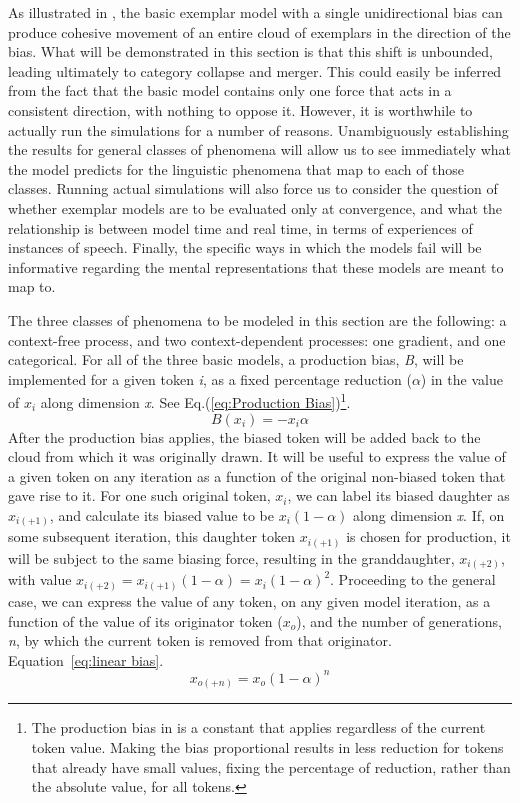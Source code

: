 As illustrated in , the basic
exemplar model with a single unidirectional bias can produce cohesive
movement of an entire cloud of exemplars in the direction of the bias.
What will be demonstrated in this section is that this shift is unbounded,
leading ultimately to category collapse and merger. This could easily
be inferred from the fact that the basic model contains only one force
that acts in a consistent direction, with nothing to oppose it. However,
it is worthwhile to actually run the simulations for a number of reasons.
Unambiguously establishing the results for general classes of phenomena
will allow us to see immediately what the model predicts for the linguistic
phenomena that map to each of those classes. Running actual simulations
will also force us to consider the question of whether exemplar models
are to be evaluated only at convergence, and what the relationship
is between model time and real time, in terms of experiences of instances
of speech. Finally, the specific ways in which the models fail will
be informative regarding the mental representations that these models
are meant to map to. 

The three classes of phenomena to be modeled in this section are the
following: a context-free process, and two context-dependent processes:
one gradient, and one categorical. For all of the three basic models,
a production bias, \emph{B}, will be implemented for a given token
\emph{i}, as a fixed percentage reduction ($\alpha$) in the value
of \emph{$x_{i}$} along dimension \emph{x}. See Eq.(\ref{eq:Production Bias})\footnote{The production bias in \citet{Pierrehumbert2000} is a constant that
applies regardless of the current token value. Making the bias proportional
results in less reduction for tokens that already have small values,
fixing the percentage of reduction, rather than the absolute value,
for all tokens.}. 
\begin{equation}
B(x_{i})=-x_{i}\alpha\label{eq:Production Bias}
\end{equation}
After the production bias applies, the biased token will be added
back to the cloud from which it was originally drawn. It will be useful
to express the value of a given token on any iteration as a function
of the original non-biased token that gave rise to it. For one such
original token, $x_{i}$, we can label its biased daughter as $x_{i(+1)}$,
and calculate its biased value to be $x_{i}\left(1-\alpha\right)$
along dimension \emph{x}. If, on some subsequent iteration, this daughter
token $x_{i(+1)}$ is chosen for production, it will be subject to
the same biasing force, resulting in the granddaughter, $x_{i(+2)}$,
with value $x_{i(+2)}=x_{i(+1)}\left(1-\alpha\right)=x_{i}\left(1-\alpha\right)^{2}$.
Proceeding to the general case, we can express the value of any token,
on any given model iteration, as a function of the value of its originator
token ($x_{o}$), and the number of generations, \emph{n}, by which
the current token is removed from that originator. Equation~\ref{eq:linear bias}. 
\begin{equation}
x_{o(+n)}=x_{o}\left(1-\alpha\right)^{n}\label{eq:linear bias}
\end{equation}


